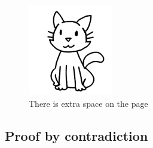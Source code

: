         ~\\~\\
        \begin{figure}[h]
            \centering
            \includegraphics[height=4cm]{images/cat.png}
            \caption*{There is extra space on the page}
        \end{figure}
    
    \newpage
    \subsection{Proof by contradiction}


